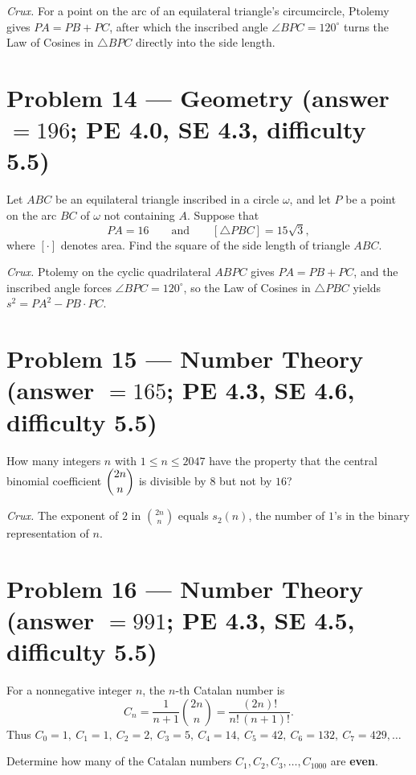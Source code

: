 \documentclass[11pt]{article}
\begin{document}
\medskip

\textit{Crux.} For a point on the arc of an equilateral triangle's circumcircle, Ptolemy gives $PA=PB+PC$, after which the inscribed angle $\angle BPC=120^\circ$ turns the Law of Cosines in $\triangle BPC$ directly into the side length.

\section*{Problem 14 --- Geometry \quad (answer $=196$; PE 4.0, SE 4.3, difficulty 5.5)}

Let $ABC$ be an equilateral triangle inscribed in a circle $\omega$, and let $P$ be a point on the arc $BC$ of $\omega$ not containing $A$. Suppose that
$$PA = 16 \qquad\text{and}\qquad [\triangle PBC] = 15\sqrt{3},$$
where $[\cdot]$ denotes area. Find the square of the side length of triangle $ABC$.

\medskip

\textit{Crux.} Ptolemy on the cyclic quadrilateral $ABPC$ gives $PA=PB+PC$, and the inscribed angle forces $\angle BPC=120^\circ$, so the Law of Cosines in $\triangle PBC$ yields $s^2 = PA^2 - PB\cdot PC$.

\section*{Problem 15 --- Number Theory \quad (answer $=165$; PE 4.3, SE 4.6, difficulty 5.5)}

How many integers $n$ with $1 \le n \le 2047$ have the property that the central binomial coefficient $\dbinom{2n}{n}$ is divisible by $8$ but not by $16$?

\medskip

\textit{Crux.} The exponent of $2$ in $\binom{2n}{n}$ equals $s_2(n)$, the number of $1$'s in the binary representation of $n$.

\section*{Problem 16 --- Number Theory \quad (answer $=991$; PE 4.3, SE 4.5, difficulty 5.5)}

For a nonnegative integer $n$, the $n$-th Catalan number is
\[
C_n=\frac{1}{n+1}\binom{2n}{n}=\frac{(2n)!}{n!\,(n+1)!}.
\]
Thus $C_0=1,\ C_1=1,\ C_2=2,\ C_3=5,\ C_4=14,\ C_5=42,\ C_6=132,\ C_7=429,\dots$

Determine how many of the Catalan numbers $C_1, C_2, C_3, \ldots, C_{1000}$ are \textbf{even}.
\end{document}
